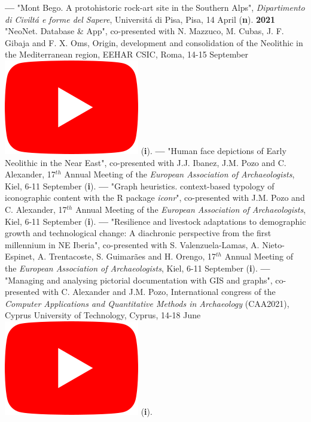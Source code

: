 \documentclass{article}
\begin{document}
\textbf{--- }"Mont Bego. A protohistoric rock-art site in the Southern Alps", \textit{Dipartimento di Civilt\'{a} e forme del Sapere}, Universit\'{a} di Pisa, Pisa, 14 April (\textbf{n}).
\smallbreak
\textbf{2021 }"NeoNet. Database \& App", co-presented with N. Mazzuco, M. Cubas, J. F. Gibaja and F. X. Oms, Origin, development and consolidation of the Neolithic in the Mediterranean region, EEHAR CSIC, Roma, 14-15 September \href{https://youtu.be/GM2niot0XwE?t=10700}{\includegraphics[scale=0.2]{icon_youtube}} (\textbf{i}).
\smallbreak
\textbf{--- }"Human face depictions of Early Neolithic in the Near East", co-presented with J.J. Ibanez, J.M. Pozo and C. Alexander, 17${}^{th}$ Annual Meeting of the \textit{European Association of Archaeologists}, Kiel, 6-11 September (\textbf{i}).
\smallbreak
\textbf{--- }"Graph heuristics. context-based typology of iconographic content with the R package \textit{iconr}", co-presented with J.M. Pozo and C. Alexander, 17${}^{th}$ Annual Meeting of the \textit{European Association of Archaeologists}, Kiel, 6-11 September (\textbf{i}).
\smallbreak
\textbf{--- }"Resilience and livestock adaptations to demographic growth and technological change: A diachronic perspective from the first millennium in NE Iberia", co-presented with S. Valenzuela-Lamas, A. Nieto-Espinet, A. Trentacoste, S. Guimarães and H. Orengo, 17${}^{th}$ Annual Meeting of the \textit{European Association of Archaeologists}, Kiel, 6-11 September (\textbf{i}).
\smallbreak
\textbf{--- }"Managing and analysing pictorial documentation with GIS and graphs", co-presented with C. Alexander and J.M. Pozo, International congress of the \textit{Computer Applications and Quantitative Methods in Archaeology} (CAA2021), Cyprus University of Technology, Cyprus, 14-18 June \href{https://youtu.be/tUhHhzGSgbk?t=4950}{\includegraphics[scale=0.2]{icon_youtube}} (\textbf{i}).
\end{document}
